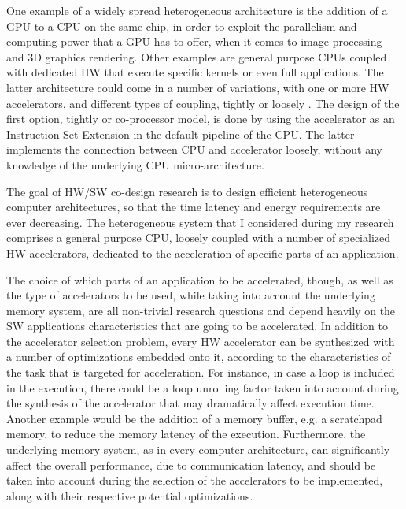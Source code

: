 \documentclass[]{usiinfthesis}
\begin{document}
One example of a widely spread heterogeneous architecture is the addition of a GPU to a CPU on the 
same chip, in order to exploit the parallelism and computing power that a GPU has to offer, when 
it comes to image processing and 3D graphics rendering. Other examples are general purpose CPUs 
coupled with dedicated HW that execute specific kernels or even full applications. The latter 
architecture could come in a number of variations, with one or more HW accelerators, and different 
types of coupling, tightly or loosely \cite{CotaJun15}. The design of the first option, tightly or 
co-processor model, is done by using the accelerator as an Instruction Set Extension in the default 
pipeline of the CPU. The latter implements the connection between CPU and accelerator loosely, without 
any knowledge of the underlying CPU micro-architecture.\par
%
%
The goal of HW/SW co-design research is to design efficient heterogeneous computer architectures, so that the
time latency and energy requirements are ever decreasing. The heterogeneous system
that I considered during my research comprises a general purpose CPU, loosely coupled with a number of 
specialized HW accelerators, dedicated to the acceleration of specific parts of an application.\par

The choice of which parts of an application to be accelerated, though, as well as the type 
of accelerators to be used, while taking into account the underlying memory system, are all
non-trivial research questions and depend heavily on the SW applications characteristics that
are going to be accelerated. In addition to the accelerator selection problem, 
every HW accelerator can be synthesized with a number of optimizations embedded onto it, according to 
the characteristics of the task that is targeted for acceleration. For instance, in case 
a loop is included in the execution, there could be a loop unrolling factor taken into account during 
the synthesis of the accelerator that may dramatically affect execution time. Another example 
would be the addition of a memory buffer, e.g. a scratchpad memory, to reduce the memory latency
of the execution. Furthermore, the underlying memory system, as in every computer architecture, can
significantly affect the overall performance, due to communication latency, and should be taken into 
account during the selection of the accelerators to be implemented, along with their respective 
potential optimizations.\par
\end{document}
